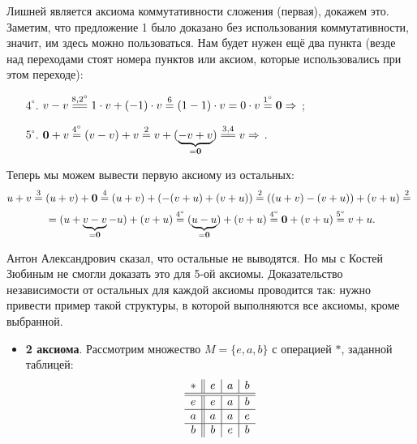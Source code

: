 \begin{solution}
    Лишней является аксиома коммутативности сложения (первая), докажем это. Заметим, что предложение 1 было доказано без использования коммутативности, значит, им здесь можно пользоваться. Нам будет нужен ещё два пункта (везде над переходами стоят номера пунктов или аксиом, которые использовались при этом переходе):
    \begin{enumerate}[nolistsep]
        \item[$4^\circ.$] $v - v \overset{8, 2^\circ}{=\joinrel=} 1 \cdot v + (-1) \cdot v \overset{6}{=} (1 - 1) \cdot v = 0 \cdot v \overset{1^\circ}{=} \bs{0} \Rightarrow$ ;
        \item[$5^\circ.$] $\bs{0} + v \overset{4^\circ}{=} (v - v) + v \overset{2}{=} v + (\underbrace{-v + v}_{{} = \bs{0}}) \overset{3, 4}{=\joinrel=} v \Rightarrow$ .
    \end{enumerate}

    Теперь мы можем вывести первую аксиому из остальных:
    \begin{multline*}
        u + v \overset{3}{=} (u + v) + \boldsymbol{0} \overset{4}{=} (u + v) + (-(v + u) + (v + u)) \overset{2}{=} ((u + v) - (v + u)) + (v + u) \overset{2}{=} {}\\\displaystyle {} = (u + \underbrace{v - v}_{{} = \boldsymbol{0}} - u) + (v + u) \overset{4^\circ}{=} (\underbrace{u - u}_{{} = \boldsymbol{0}}) + (v + u) \overset{4^\circ}{=} \boldsymbol{0} + (v + u) \overset{5^\circ}{=} v + u.
    \end{multline*}

Антон Александрович сказал, что остальные не выводятся. Но мы с Костей Зюбиным не смогли доказать это для 5-ой аксиомы. Доказательство независимости от остальных для каждой аксиомы проводится так: нужно привести пример такой структуры, в которой выполняются все аксиомы, кроме выбранной.
    \begin{itemize}
        \item \textbf{2 аксиома}. Рассмотрим множество $M = \{e, a, b\}$ с операцией $\ast$, заданной таблицей:
            $$
            \begin{array}{c || c | c | c}
                \ast & e & a & b\\
                \hline\hline
                e & e & a & b\\
                \hline
                a & a & a & e\\
                \hline
                b & b & e & b
            \end{array}
            $$


\end{itemize}
\end{solution}

